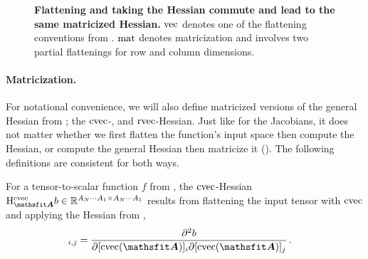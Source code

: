\switchcolumn[1]
\begin{figure}[!h]
  \centering
  \caption{\textbf{Flattening and taking the Hessian commute and lead to the same matricized Hessian.}
    $\vec$ denotes one of the flattening conventions from .
    $\mat$ denotes matricization and involves two partial flattenings for row and column dimensions.}\label{fig:commutative-diagram-hessian}
\end{figure}
\switchcolumn[0]

\paragraph{Matricization.} For notational convenience, we will also define matricized versions of the general Hessian from ; the $\cvec$-, and $\rvec$-Hessian. Just like for the Jacobians, it does not matter whether we first flatten the function's input space then compute the Hessian, or compute the general Hessian then matricize it ().
The following definitions are consistent for both ways.

\switchcolumn[1]
\switchcolumn[0]

\begin{definition}\label{def:cvec_hessian}
  For a tensor-to-scalar function $f$ from , the $\cvec$-Hessian $\hess_{\tA}^{\cvec}b \in \sR^{A_N \cdots A_1 \times A_N \cdots A_1}$ results from flattening the input tensor with $\cvec$ and applying the Hessian from ,
  \begin{align*}
    [\hess^{\cvec}_{\tA}b]_{i, j}
     & =
    \frac{\partial^2 b}{\partial [\cvec(\tA)]_{i} \partial [\cvec(\tA)]_{j}}\,.
  \end{align*}
\end{definition}

